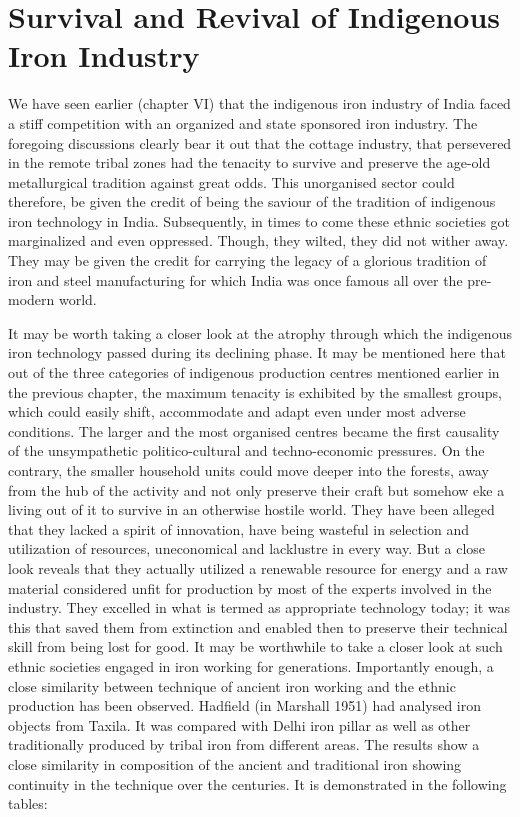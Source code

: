\chapter{Survival and Revival of Indigenous Iron Industry}\label{chapter7}




We have seen earlier (chapter VI) that the indigenous iron industry of India faced a stiff competition with an organized and state sponsored iron industry.  The foregoing discussions clearly bear it out that the cottage industry, that persevered in the remote tribal zones had the tenacity to survive and preserve the age-old metallurgical tradition against great odds. This unorganised sector could therefore, be given the credit of being the saviour of the tradition of indigenous iron technology in India. Subsequently, in times to come these ethnic societies got marginalized and even oppressed. Though, they wilted, they did not wither away. They may be given the credit for carrying the legacy of a glorious tradition of iron and steel manufacturing for which India was once famous all over the pre-modern world.

It may be worth taking a closer look at the atrophy through which the indigenous iron technology passed during its declining phase. It may be mentioned here that out of the three categories of indigenous production centres mentioned earlier in the previous chapter, the maximum tenacity is exhibited by the smallest groups, which could easily shift, accommodate and adapt even under most adverse conditions. The larger and the most organised centres became the first causality of the unsympathetic politico-cultural and techno-economic pressures. On the contrary, the smaller household units could move deeper into the forests, away from the hub of the activity and not only preserve their craft but somehow eke a living out of it to survive in an otherwise hostile world. They have been alleged that they lacked a spirit of innovation, have being wasteful in selection and utilization of resources, uneconomical and lacklustre in every way. But a close look reveals that they actually utilized a renewable resource for energy and a raw material considered unfit for production by most of the experts involved in the industry. They excelled in what is termed as appropriate technology today; it was this that saved them from extinction and enabled then to preserve their technical skill from being lost for good. It may be worthwhile to take a closer look at such ethnic societies engaged in iron working for generations. Importantly enough, a close similarity between technique of ancient iron working and the ethnic production has been observed. Hadfield (in Marshall 1951) had analysed iron objects from Taxila. It was compared with Delhi iron pillar as well as other traditionally produced by tribal iron from different areas. The results show a close similarity in composition of the ancient and traditional iron showing continuity in the technique over the centuries. It is demonstrated in the following tables: 

